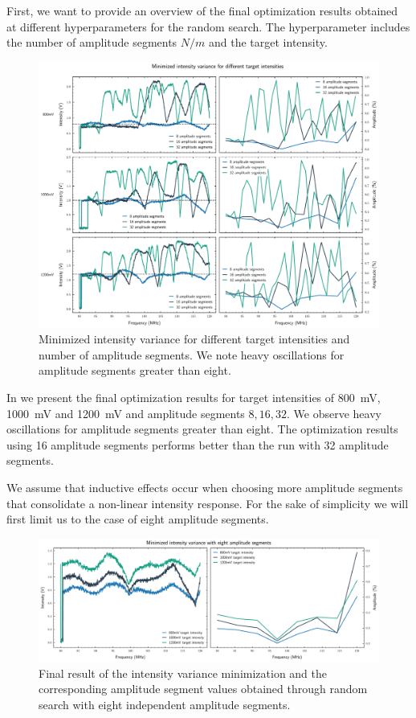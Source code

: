 First, we want to provide an overview of the final optimization results
obtained at different hyperparameters for the random search. The
hyperparameter includes the number of amplitude segments $N/m$ and the target
intensity.
\begin{figure}[htb]
  \centering
  \includegraphics[width=\textwidth]{../figure/intensity/optimization/overview.pdf}
  \caption{Minimized intensity variance for different target intensities
  and number of amplitude segments. We note heavy oscillations for
  amplitude segments greater than eight.}
  \label{fig:intensity_optimization_overview}
\end{figure}
In  we present the final
optimization results for target intensities of \SI{800}{\milli\volt},
\SI{1000}{\milli\volt} and \SI{1200}{\milli\volt} and amplitude segments
$8,16,32$. We observe heavy oscillations for amplitude segments greater than
eight. The optimization results using 16 amplitude segments performs better
than the run with 32 amplitude segments.

We assume that inductive effects occur when choosing more amplitude segments
that consolidate a non-linear intensity response. For the sake of simplicity
we will first limit us to the case of eight amplitude segments.

\begin{figure}[htb]
  \centering
  \includegraphics[width=\textwidth]{../figure/intensity/optimization/intensity-amplitude.pdf}
  \caption{Final result of the intensity variance minimization and the
  corresponding amplitude segment values obtained through random search with
  eight independent amplitude segments.}
  \label{fig:intensity_optimization_intensity_amplitude}
\end{figure}

